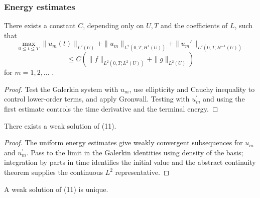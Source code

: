 \subsubsection{Energy estimates}

\begin{theorem}
\label{thm:parabolic-energy-estimates}

There exists a constant $C$, depending only on $U, T$ and the coefficients of $L$, such that
\[
\max_{0 \leq t \leq T} \|u_m(t)\|_{L^2(U)} + \|u_m\|_{L^2(0,T; H^1(U))} + \|u_m'\|_{L^2(0,T; H^{-1}(U))}
\]
\[
\leq C(\|f\|_{L^2(0,T; L^2(U))} + \|g\|_{L^2(U)})
\]
for $m = 1, 2, \ldots$ .
\end{theorem}

\begin{proof}
\sketch Test the Galerkin system with $u_m$, use ellipticity and Cauchy inequality to control lower-order terms, and apply Gronwall. Testing with $u_m^{\prime}$ and using the first estimate controls the time derivative and the terminal energy.
\end{proof}

\begin{theorem}
\label{thm:parabolic-existence-weak-solution}

There exists a weak solution of (11).
\end{theorem}

\begin{proof}
\sketch The uniform energy estimates give weakly convergent subsequences for $u_m$ and $u_m^{\prime}$. Pass to the limit in the Galerkin identities using density of the basis; integration by parts in time identifies the initial value and the abstract continuity theorem supplies the continuous $L^2$ representative.
\end{proof}

\begin{theorem}
\label{thm:parabolic-uniqueness-weak-solution}

A weak solution of (11) is unique.
\end{theorem}

